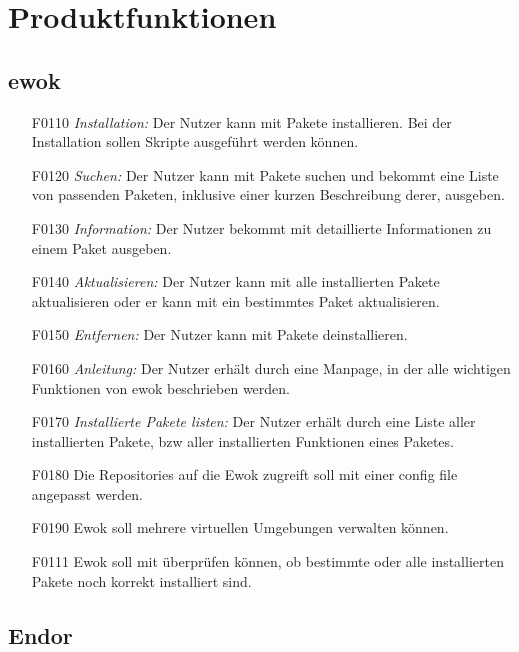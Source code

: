 \chapter{Produktfunktionen}

\section{ewok}

\begin{itemize}
	\item[F0110] \textit{Installation:} Der Nutzer kann mit  Pakete installieren. Bei der Installation sollen Skripte ausgeführt werden können.
	\item[F0120] \textit{Suchen:} Der Nutzer kann mit  Pakete suchen und bekommt eine Liste von passenden Paketen, inklusive einer kurzen Beschreibung derer, ausgeben.
	\item[F0130] \textit{Information:} Der Nutzer bekommt mit  detaillierte Informationen zu einem Paket ausgeben.
	\item[F0140] \textit{Aktualisieren:} Der Nutzer kann mit  alle installierten Pakete aktualisieren oder er kann mit  ein bestimmtes Paket aktualisieren.
	\item[F0150] \textit{Entfernen:} Der Nutzer kann mit  Pakete deinstallieren.
	\item[F0160] \textit{Anleitung:} Der Nutzer erhält durch  eine Manpage, in der alle wichtigen Funktionen von ewok beschrieben werden.
	\item[F0170] \textit{Installierte Pakete listen:} Der Nutzer erhält durch  eine Liste aller installierten Pakete, bzw aller installierten Funktionen eines Paketes.
	\item[F0180] Die Repositories auf die Ewok zugreift soll mit einer config file angepasst werden.
	\item[F0190] Ewok soll mehrere virtuellen Umgebungen verwalten können. 
	\item[F0111] Ewok soll mit 	 überprüfen können, ob bestimmte oder alle installierten Pakete noch korrekt installiert sind.
\end{itemize}

\section{Endor}

